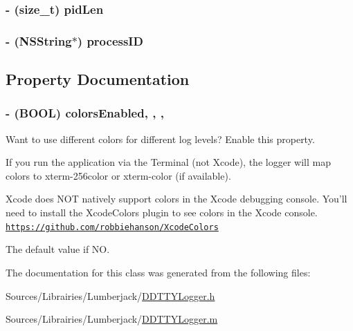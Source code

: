 \hypertarget{interface_d_d_t_t_y_logger_a7585c0c145ea2043d0048339afae9e2a}{
\subsubsection[{pid\-Len}]{\setlength{\rightskip}{0pt plus 5cm}-\/ (size\-\_\-t) pid\-Len\hspace{0.3cm}{\ttfamily [protected]}}}\label{interface_d_d_t_t_y_logger_a7585c0c145ea2043d0048339afae9e2a}
\hypertarget{interface_d_d_t_t_y_logger_a43d53c81250bb1910fec950b80f2ade1}{
\subsubsection[{process\-I\-D}]{\setlength{\rightskip}{0pt plus 5cm}-\/ (N\-S\-String$\ast$) process\-I\-D\hspace{0.3cm}{\ttfamily [protected]}}}\label{interface_d_d_t_t_y_logger_a43d53c81250bb1910fec950b80f2ade1}


\subsection{Property Documentation}
\hypertarget{interface_d_d_t_t_y_logger_a4d0b3f3f5bb3b8d220568b7e8b1fb9d8}{
\subsubsection[{colors\-Enabled}]{\setlength{\rightskip}{0pt plus 5cm}-\/ (B\-O\-O\-L) colors\-Enabled\hspace{0.3cm}{\ttfamily [read]}, {\ttfamily [write]}, {\ttfamily [atomic]}, {\ttfamily [assign]}}}\label{interface_d_d_t_t_y_logger_a4d0b3f3f5bb3b8d220568b7e8b1fb9d8}
Want to use different colors for different log levels? Enable this property.

If you run the application via the Terminal (not Xcode), the logger will map colors to xterm-\/256color or xterm-\/color (if available).

Xcode does N\-O\-T natively support colors in the Xcode debugging console. You'll need to install the Xcode\-Colors plugin to see colors in the Xcode console. \href{https://github.com/robbiehanson/XcodeColors}{\tt https\-://github.\-com/robbiehanson/\-Xcode\-Colors}

The default value if N\-O. 

The documentation for this class was generated from the following files\-:\begin{DoxyCompactItemize}
\item 
Sources/\-Librairies/\-Lumberjack/\hyperlink{_d_d_t_t_y_logger_8h}{D\-D\-T\-T\-Y\-Logger.\-h}\item 
Sources/\-Librairies/\-Lumberjack/\hyperlink{_d_d_t_t_y_logger_8m}{D\-D\-T\-T\-Y\-Logger.\-m}\end{DoxyCompactItemize}
